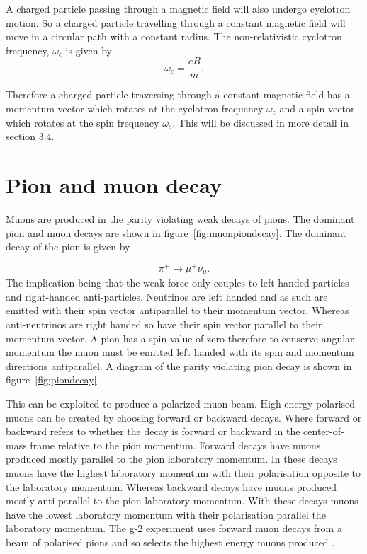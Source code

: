 A charged particle passing through a magnetic field will also undergo cyclotron motion. So a charged particle travelling through a constant magnetic field will move in a circular path with a constant radius. The non-relativistic cyclotron frequency, $\omega_{c}$ is given by
\begin{equation}
\omega_{c} = \frac{eB}{{m}}.
\end{equation}

Therefore a charged particle traversing through a constant magnetic field has a momentum vector which rotates at the cyclotron frequency $\omega_{c}$ and a spin vector which rotates at the spin frequency $\omega_{s}$. This will be discussed in more detail in section 3.4.

\section{Pion and muon decay}

Muons are produced in the parity violating weak decays of pions. The dominant pion and muon decays are shown in figure~\ref{fig:muonpiondecay}. The dominant decay of the pion is given by

\begin{equation}
{\pi^{+}}\rightarrow{\mu^{+}}\nu{_\mu}.
\end{equation}
\noindent
The implication being that the weak force only couples to left-handed particles and right-handed anti-particles. Neutrinos are left handed and as such are emitted with their spin vector antiparallel to their momentum vector. Whereas anti-neutrinos are right handed so have their spin vector parallel to their momentum vector. A pion has a spin value of zero therefore to conserve angular momentum the muon must be emitted left handed with its spin and momentum directions antiparallel. A diagram of the parity violating pion decay is shown in figure~\ref{fig:piondecay}.

This can be exploited to produce a polarized muon beam. High energy polarised muons can be created by choosing forward or backward decays. Where forward or backward refers to whether the decay is forward or backward in the center-of-mass frame relative to the pion momentum. Forward decays have muons produced mostly parallel to the pion laboratory momentum. In these decays muons have the highest laboratory momentum with their polarisation opposite to the laboratory momentum. Whereas backward decays have muons produced mostly anti-parallel to the pion laboratory momentum. With these decays muons have the lowest laboratory momentum with their polarisation parallel the laboratory momentum. The g-2 experiment uses forward muon decays from a beam of polarised pions and so selects the highest energy muons produced \cite{Reference29}.

